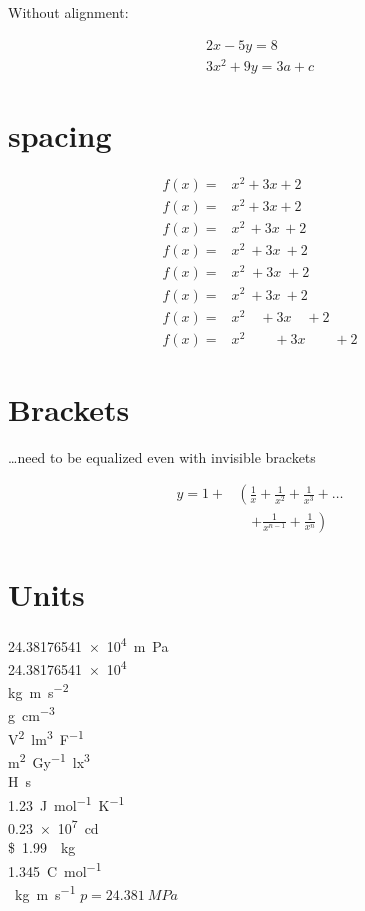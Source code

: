 Without alignment:

\begin{gather} 
2x - 5y =  8 \\ 
3x^2 + 9y =  3a + c
\end{gather}

\section{spacing}
\begin{align*}
f(x) =& x^2\! +3x\! +2 \\
f(x) =& x^2+3x+2 \\
f(x) =& x^2\, +3x\, +2 \\
f(x) =& x^2\: +3x\: +2 \\
f(x) =& x^2\; +3x\; +2 \\
f(x) =& x^2\ +3x\ +2 \\
f(x) =& x^2\quad +3x\quad +2 \\
f(x) =& x^2\qquad +3x\qquad +2
\end{align*}

\section{Brackets}

\ldots need to be equalized even with invisible brackets

\begin{align}
y  = 1 + & \left(  \frac{1}{x} + \frac{1}{x^2} + \frac{1}{x^3} + \ldots \right. \\
& \quad \left. + \frac{1}{x^{n-1}} + \frac{1}{x^n} \right)	
\end{align}

\section{Units}
\SI{24,38176541e4}{m.Pa} \\
\num{24,38176541e4} \\
\si{\kilo\gram\metre\per\square\second} \\
\si{\gram\per\cubic\centi\metre}        \\
\si{\square\volt\cubic\lumen\per\farad} \\
\si{\metre\squared\per\gray\cubic\lux}  \\
\si{\henry\second} \\
\SI[mode=text]{1.23}{J.mol^{-1}.K^{-1}}          \\
\SI{.23e7}{\candela}                              \\
\SI[per-mode=symbol]{1.99}[\$]{\per\kilogram}    \\
\SI[per-mode=fraction]{1,345}{\coulomb\per\mole} \\
\si[unit-color=blue]{\kilogram\metre\per\second}
$p=\SI{24,381}{MPa}$

